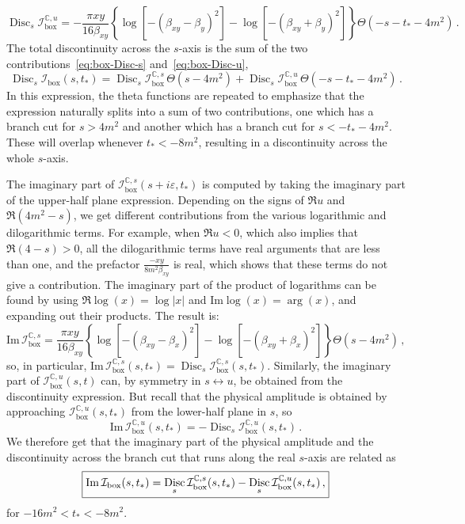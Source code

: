 \documentclass[12pt]{article}
\numberwithin{figure}{section}
\DeclareMathOperator{\Disc}{Disc}
\def \be {\begin{equation}}
\def \ee {\end{equation}}
\def \C {\mathbb{C}}
\def \I {\mathcal{I}}
\def \Im {\mathrm{Im}}
\def \boxx {\mathrm{box}}
\begin{document}
	\be\label{eq:box-Disc-u}
	    \Disc_s \I_\boxx^{\C,u} = - \frac{\pi x y}{16 \beta_{xy}}  \left\{
	    \log\left[- ( \beta_{xy}-\beta_y)^2 \right]
	    -
	    \log\left[- ( \beta_{xy}+\beta_y)^2 \right]
	    \right\} \Theta(-s{-}t_\ast{-}4m^2) \,.
	\ee 
	The total discontinuity across the $s$-axis is the sum of the two contributions~\eqref{eq:box-Disc-s} and~\eqref{eq:box-Disc-u},
	\be 
	\Disc_s \I_\boxx (s,t_\ast) = \Disc_s \I_\boxx^{\C,s}\, \Theta(s{-}4m^2) + \Disc_s \I_\boxx^{\C,u}\, \Theta(-s{-}t_\ast{-}4m^2) \,.
	\ee 
	In this expression, the theta functions are repeated to emphasize that the expression naturally splits into a sum of two contributions, one which has a branch cut for $s>4 m^2$ and another which has a branch cut for $s<-t_\ast{-}4 m^2$. These will overlap whenever $t_\ast<-8 m^2$, resulting in a discontinuity across the whole $s$-axis.
	
	The imaginary part of $\I_\boxx^{\C,s} (s+i\varepsilon,t_\ast)$ is computed by taking the imaginary part of the upper-half plane expression. Depending on the signs of $\Re u$ and $\Re (4m^2-s)$, we get different contributions from the various logarithmic and dilogarithmic terms. For example, when $\Re u <0$, which also implies that $\Re(4-s)>0$, all the dilogarithmic terms have real arguments that are less than one, and the prefactor $\frac{-x y}{8 m^2 \beta_{xy}}$ is real, which shows that these terms do not give a contribution. The imaginary part of the product of logarithms can be found by using $\Re \log(x) = \log \vert x \vert$ and $\Im \log(x) = \arg (x)$, and expanding out their products. The result is:
	\be 
	    \Im \, \I_\boxx^{\C,s} = \frac{\pi x y}{16 \beta_{xy}}  \left\{
	    \log\left[- ( \beta_{xy}-\beta_x)^2 \right]
	    -
	    \log\left[- ( \beta_{xy}+\beta_x)^2 \right]
	    \right\} \Theta(s-4m^2) \,,
	\ee 
	so, in particular, $\Im \,\I_\boxx^{\C,s} (s,t_\ast) = \Disc_s \I_\boxx^{\C,s} (s,t_\ast)$. Similarly, the imaginary part of $\I_\boxx^{\C,u} (s,t)$ can, by symmetry in $s \leftrightarrow u$, be obtained from the discontinuity expression. But recall that the physical amplitude is obtained by approaching $\I_\boxx^{\C,u} (s,t_\ast)$ from the lower-half plane in $s$, so
	\be 
	\Im \, \I_\boxx^{\C,u} (s,t_\ast) = - \Disc_s \I_\boxx^{\C,u} (s,t_\ast) \,.
	\ee 
	We therefore get that the imaginary part of the physical amplitude and the discontinuity across the branch cut that runs along the real $s$-axis are related as
	\be\boxed{\label{eq:Im-box}
	    \Im \, \I_\boxx(s,t_\ast) = \Disc_s \I_\boxx^{\C,s} (s,t_\ast) - \Disc_s \I_\boxx^{\C,u} (s,t_\ast) \,,}
	\ee 
	for $-16 m^2 < t_\ast < -8 m^2$.
	
\end{document}
